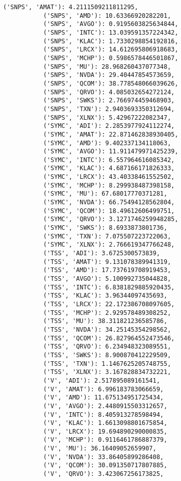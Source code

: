 \documentclass[11pt]{article}
\begin{document}
\begin{Verbatim}[commandchars=\\\{\}]
           ('SNPS', 'AMAT'): 4.2111509211811295,
           ('SNPS', 'AMD'): 10.63366920282201,
           ('SNPS', 'AVGO'): 0.9195603825634844,
           ('SNPS', 'INTC'): 13.039591357224342,
           ('SNPS', 'KLAC'): 1.7330298854192816,
           ('SNPS', 'LRCX'): 14.612695806918683,
           ('SNPS', 'MCHP'): 0.5986578446501867,
           ('SNPS', 'MU'): 28.968260437077348,
           ('SNPS', 'NVDA'): 29.40447854573659,
           ('SNPS', 'QCOM'): 38.778548066039626,
           ('SNPS', 'QRVO'): 4.085032654272124,
           ('SNPS', 'SWKS'): 2.766974459468903,
           ('SNPS', 'TXN'): 2.9403693350312694,
           ('SNPS', 'XLNX'): 5.42967222082347,
           ('SYMC', 'ADI'): 2.2853977924112274,
           ('SYMC', 'AMAT'): 22.871462838930405,
           ('SYMC', 'AMD'): 9.402337134118063,
           ('SYMC', 'AVGO'): 11.911479971425239,
           ('SYMC', 'INTC'): 6.557964616085342,
           ('SYMC', 'KLAC'): 4.687166171826333,
           ('SYMC', 'LRCX'): 43.40338461552502,
           ('SYMC', 'MCHP'): 8.299938487398158,
           ('SYMC', 'MU'): 67.68017770371281,
           ('SYMC', 'NVDA'): 66.75494128562804,
           ('SYMC', 'QCOM'): 18.49612606499751,
           ('SYMC', 'QRVO'): 3.1271746259948285,
           ('SYMC', 'SWKS'): 8.6933873801736,
           ('SYMC', 'TXN'): 7.075507223722063,
           ('SYMC', 'XLNX'): 2.766619347766248,
           ('TSS', 'ADI'): 3.6725300573839,
           ('TSS', 'AMAT'): 9.131078389941319,
           ('TSS', 'AMD'): 17.737619708919453,
           ('TSS', 'AVGO'): 5.100992735044828,
           ('TSS', 'INTC'): 6.8381829885920435,
           ('TSS', 'KLAC'): 3.96344097435693,
           ('TSS', 'LRCX'): 22.172386708097605,
           ('TSS', 'MCHP'): 2.929578489308252,
           ('TSS', 'MU'): 38.311821236585786,
           ('TSS', 'NVDA'): 34.25145354298562,
           ('TSS', 'QCOM'): 26.827964552473546,
           ('TSS', 'QRVO'): 6.234948323089551,
           ('TSS', 'SWKS'): 8.900870412229509,
           ('TSS', 'TXN'): 1.1467625205748755,
           ('TSS', 'XLNX'): 3.167828834732221,
           ('V', 'ADI'): 2.517895089161541,
           ('V', 'AMAT'): 6.996183783066659,
           ('V', 'AMD'): 11.675134951725434,
           ('V', 'AVGO'): 2.4480915503312657,
           ('V', 'INTC'): 8.405913278598494,
           ('V', 'KLAC'): 1.6613098801675854,
           ('V', 'LRCX'): 19.694890290000835,
           ('V', 'MCHP'): 0.9116461786887379,
           ('V', 'MU'): 36.16409052659907,
           ('V', 'NVDA'): 33.86405899286408,
           ('V', 'QCOM'): 30.091350717807885,
           ('V', 'QRVO'): 3.423067256173825,

\end{Verbatim}
\end{document}
